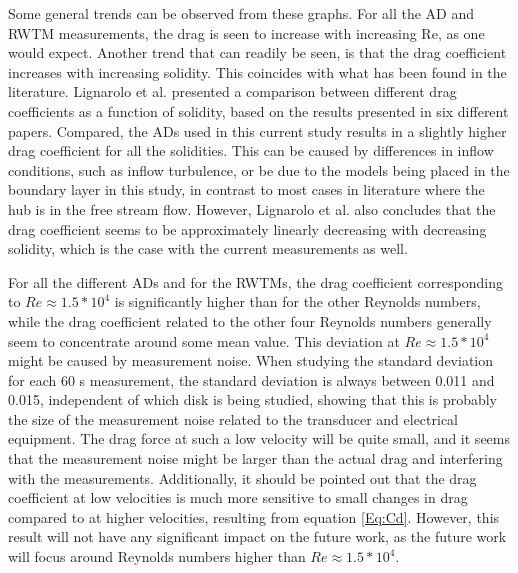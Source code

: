 Some general trends can be observed from these graphs. For all the \gls{AD} and \gls{RWTM} measurements, the drag is seen to increase with increasing Re, as one would expect. Another trend that can readily be seen, is that the drag coefficient increases with increasing solidity. This coincides with what has been found in the literature. Lignarolo et al. \cite{Lignarolo2016} presented a comparison between different drag coefficients as a function of solidity, based on the results presented in six different papers. Compared, the \gls{AD}s used in this current study results in a slightly higher drag coefficient for all the solidities. This can be caused by differences in inflow conditions, such as inflow turbulence, or be due to the models being placed in the boundary layer in this study, in contrast to most cases in literature where the hub is in the free stream flow. However, Lignarolo et al. also concludes that the drag coefficient seems to be approximately linearly decreasing with decreasing solidity, which is the case with the current measurements as well. 

 
For all the different \gls{AD}s and for the \gls{RWTM}s, the drag coefficient corresponding to $Re \approx 1.5*10^4$ is significantly higher than for the other Reynolds numbers, while the drag coefficient related to the other four Reynolds numbers generally seem to concentrate around some mean value. This deviation at $Re \approx 1.5*10^4$ might be caused by measurement noise. When studying the standard deviation for each 60 \si{\s} measurement, the standard deviation is always between 0.011 and 0.015, independent of which disk is being studied, showing that this is probably the size of the measurement noise related to the transducer and electrical equipment. The drag force at such a low velocity will be quite small, and it seems that the measurement noise might be larger than the actual drag and interfering with the measurements. Additionally, it should be pointed out that the drag coefficient at low velocities is much more sensitive to small changes in drag compared to at higher velocities, resulting from equation \ref{Eq:Cd}. However, this result will not have any significant impact on the future work, as the future work will focus around Reynolds numbers higher than $Re \approx 1.5*10^4$.


